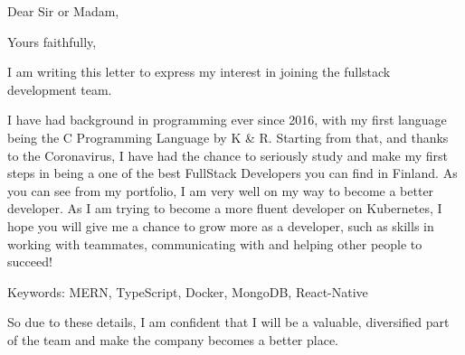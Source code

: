 \documentclass[11pt,a4paper,sans]{moderncv}
\begin{document}
  \clearpage

  \date{February 1, 2021}
  \opening{Dear Sir or Madam,}
  \closing{Yours faithfully,}
  \makelettertitle

  I am writing this letter to express my interest in joining the
  fullstack development team.

  I have had background in programming ever since 2016, with my
  first language being the C Programming Language by K \& R. Starting
  from that, and thanks to the Coronavirus, I have had the chance
  to seriously study and make my first steps in being a
  one of the best FullStack Developers you can find in Finland.
  As you can see from my portfolio, I am very well on my way to become
  a better developer. As I am trying to become a more fluent developer on Kubernetes,
  I hope you will give me a chance to grow more as a developer,
  such as skills in working with teammates, communicating with and helping other
  people to succeed!

  Keywords: MERN, TypeScript, Docker, MongoDB, React-Native

  So due to these details, I am confident that I will be a valuable, diversified
  part of the team and make the company becomes a better place.

  \makeletterclosing
\end{document}
